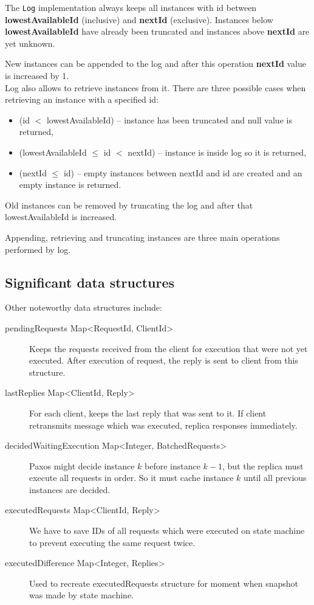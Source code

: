 The \texttt{Log} implementation always keeps all instances with id between \textbf{lowestAvailableId} (inclusive) and \textbf{nextId} (exclusive). Instances below \textbf{lowestAvailableId} have already been truncated and instances above \textbf{nextId} are yet unknown. %

New instances can be appended to the log and after this operation \textbf{nextId} value is increased by 1. \\Log also allows to retrieve instances from it. There are three possible cases when retrieving an instance with a specified id:
\begin{itemize}
  \item (id $<$ lowestAvailableId) -- instance has been truncated and null value is returned,
  \item (lowestAvailableId $\leq$ id $<$ nextId) -- instance is inside log so it is returned,
  \item (nextId $\leq$ id) -- empty instances between nextId and id are created and an empty instance is returned.
\end{itemize}
Old instances can be removed by truncating the log and after that lowestAvailableId is increased. 

Appending, retrieving and truncating instances are three main operations per\-for\-med by log.

\subsection{Significant data structures}


Other noteworthy data structures include:
\label{subsubsec:significant_structures}
  \begin{description}
    \item[pendingRequests Map\textless RequestId, ClientId\textgreater] Keeps the requests received from the client for execution that were not yet executed. After execution of request, the reply is sent to client from this structure.
    \item[lastReplies Map\textless ClientId, Reply\textgreater] For each client, keeps the last reply that was sent to it. If client retransmits message which was executed, replica responses immediately.
    \item[decidedWaitingExecution Map\textless Integer, BatchedRequests\textgreater] Paxos might decide in\-stan\-ce $k$ before instance $k-1$, but the replica must execute all requests in order. So it must cache in\-stan\-ce $k$ until all previous instances are decided.
    \item[executedRequests Map\textless ClientId, Reply\textgreater] We have to save IDs of all requests which were executed on state machine to prevent executing the same request twice.
	\item[executedDifference Map\textless Integer, Replies\textgreater] Used to recreate executedRequests stru\-ctu\-re for moment when snapshot was made by state machine.
  \end{description}




